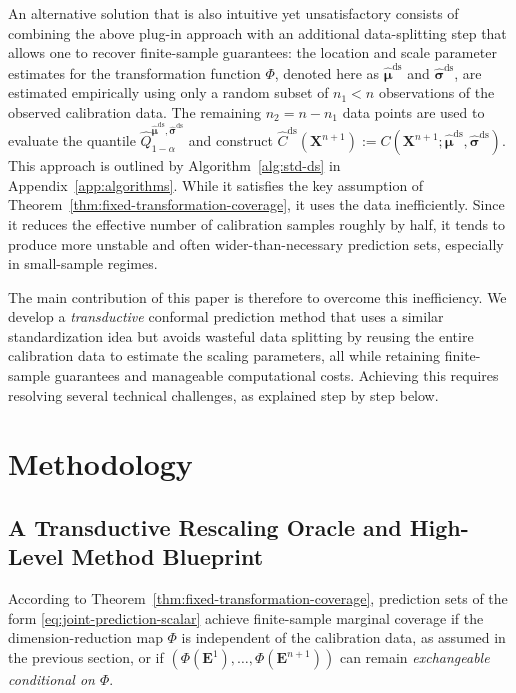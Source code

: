 An alternative solution that is also intuitive yet unsatisfactory consists of combining the above plug-in approach with an additional data-splitting step that allows one to recover finite-sample guarantees: the location and scale parameter estimates for the transformation function $\Phi$, denoted here as $\boldsymbol{\hat{\mu}^{\mathrm{ds}}}$ and $\boldsymbol{\hat{\sigma}^{\mathrm{ds}}}$, are estimated empirically using only a random subset of $n_1 < n$ observations of the observed calibration data. The remaining $n_2 = n-n_1$ data points are used to evaluate the quantile $\hat{Q}^{\hat{\boldsymbol\mu}^{\mathrm{ds}}, \hat{\boldsymbol\sigma}^{\mathrm{ds}}}_{1-\alpha}$ and construct $\hat{C}^{\mathrm{ds}}(\mathbf{X}^{n+1}):= C(\mathbf{X}^{n+1};\hat{\boldsymbol\mu}^{\mathrm{ds}}, \hat{\boldsymbol\sigma}^{\mathrm{ds}})$.
This approach is outlined by Algorithm~\ref{alg:std-ds} in Appendix~\ref{app:algorithms}.
While it satisfies the key assumption of Theorem~\ref{thm:fixed-transformation-coverage}, it uses the data inefficiently. Since it reduces the effective number of calibration samples roughly by half, it tends to produce more unstable and often wider-than-necessary prediction sets, especially in small-sample regimes.

The main contribution of this paper is therefore to overcome this inefficiency. We develop a \emph{transductive} conformal prediction method that uses a similar standardization idea but avoids wasteful data splitting by reusing the entire calibration data to estimate the scaling parameters, all while retaining finite-sample guarantees and manageable computational costs.
Achieving this requires resolving several technical challenges, as explained step by step below.


\section{Methodology} \label{sec:methods}

\subsection{A Transductive Rescaling Oracle and High-Level Method Blueprint}\label{sec:method-oracle}

According to Theorem~\ref{thm:fixed-transformation-coverage}, prediction sets of the form \eqref{eq:joint-prediction-scalar} achieve finite-sample marginal coverage if the dimension-reduction map $\Phi$ is independent of the calibration data, as assumed in the previous section, or if $(\Phi(\mathbf{E}^1),\ldots,\Phi(\mathbf{E}^{n+1}))$ can remain \emph{exchangeable conditional on $\Phi$}.

